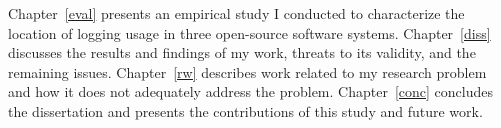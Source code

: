 Chapter~\ref{eval} presents an empirical study I conducted to characterize the location of logging usage in three open-source software systems. Chapter~\ref{diss} discusses the results and findings of my work, threats to its validity, and the remaining issues. Chapter~\ref{rw} describes work related to my research problem and how it does not adequately address the problem. Chapter~\ref{conc} concludes the dissertation and presents the contributions of this study and future work. %




